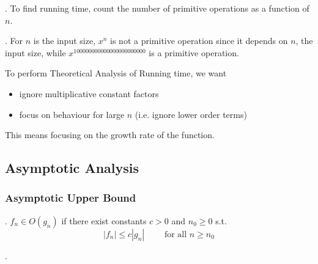 \documentclass{article}
\begin{document}
\begin{thmm}[].
    To find running time, count the number of primitive operations as a function of $n$. 
\end{thmm}

\begin{codes}[].
    For $n$ is the input size, $x^n$ is not a primitive operation since it depends on $n$, the input size, while $x^{100000000000000000000000}$ is a primitive operation. 
\end{codes}

To perform Theoretical Analysis of Running time, we want \begin{itemize}
    \item ignore multiplicative constant factors 
    \item focus on behaviour for large $n$ (i.e. ignore lower order terms) 
\end{itemize}
This means focusing on the growth rate of the function. 

\subsection{Asymptotic Analysis}

\subsubsection{Asymptotic Upper Bound}

\begin{deff}.
    $f_n \in O(g_n)$ if there exist constants $c > 0$ and $n_0 \geq 0$ s.t. 
    \[ |f_n| \leq c |g_n| \qquad \text{ for all } n \geq n_0 \]
\end{deff}

\begin{examplee}[].
    \begin{center}
    \end{center}
\end{examplee}
\end{document}
